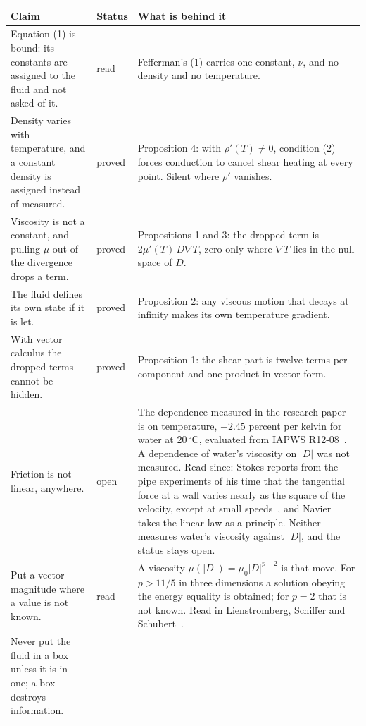 \begin{longtable}{@{}>{\raggedright\arraybackslash}p{}>{\raggedright\arraybackslash}p{}>{\raggedright\arraybackslash}p{}@{}}
\toprule
Claim & Status & What is behind it \\
\midrule
\endhead
\bottomrule
\endfoot
Equation (1) is bound: its constants are assigned to the fluid and not asked of it.
& read
& Fefferman's (1) carries one constant, $\nu$, and no density and no temperature. \\[0.6em]
Density varies with temperature, and a constant density is assigned instead of measured.
& proved
& Proposition 4: with $\rho'(T)\neq 0$, condition (2) forces conduction to cancel shear heating at
every point. Silent where $\rho'$ vanishes. \\[0.6em]
Viscosity is not a constant, and pulling $\mu$ out of the divergence drops a term.
& proved
& Propositions 1 and 3: the dropped term is $2\mu'(T)\,D\nabla T$, zero only where $\nabla T$ lies
in the null space of $D$. \\[0.6em]
The fluid defines its own state if it is let.
& proved
& Proposition 2: any viscous motion that decays at infinity makes its own temperature
gradient. \\[0.6em]
With vector calculus the dropped terms cannot be hidden.
& proved
& Proposition 1: the shear part is twelve terms per component and one product in vector
form. \\[0.6em]
Friction is not linear, anywhere.
& open
& The dependence measured in the research paper is on temperature, $-2.45$ percent per kelvin
for water at $20\,^\circ$C, evaluated from IAPWS R12-08~\cite{src:IAPWS-R12-08}. A dependence of water's
viscosity on $|D|$ was not measured. Read since: Stokes reports from the pipe experiments of
his time that the tangential force at a wall varies nearly as the square of the velocity, except at
small speeds~\cite{src:Stokes-1845}, and Navier takes the linear law as a principle. Neither
measures water's viscosity against $|D|$, and the status stays open. \\[0.6em]
Put a vector magnitude where a value is not known.
& read
& A viscosity $\mu(|D|) = \mu_0|D|^{p-2}$ is that move. For $p > 11/5$ in three dimensions a
solution obeying the energy equality is obtained; for $p = 2$ that is not known. Read in
Lienstromberg, Schiffer and Schubert~\cite{src:Lienstromberg-Schiffer-Schubert-2025}. \\[0.6em]
Never put the fluid in a box unless it is in one; a box destroys information.

\end{longtable}

